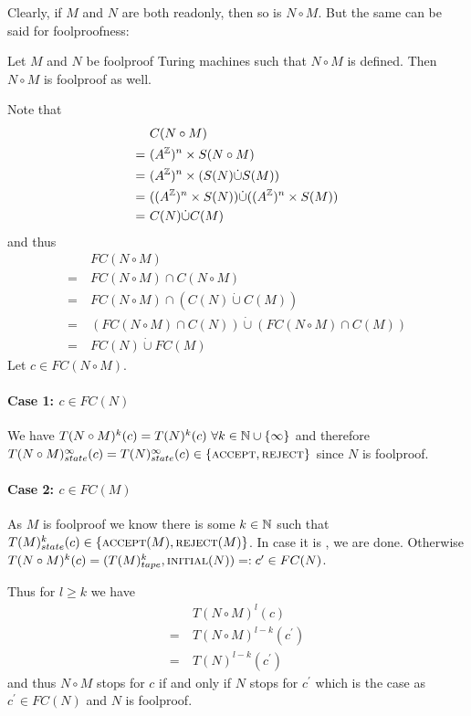 Clearly, if $M$ and $N$ are both readonly, then so is $N \circ M$. But the same can be said for foolproofness:

\begin{Lemma}
	Let $M$ and $N$ be foolproof Turing machines such that $N \circ M$ is defined. Then $N \circ M$ is foolproof as well.
\end{Lemma}
\proof
Note that
\begin{align*}
	&C(N \circ M) \\
	=~&(A^{\mathbb{Z}})^n \times S(N \circ M) \\
	=~&(A^{\mathbb{Z}})^n \times (S(N) \dot\cup S(M)) \\
	=~&((A^{\mathbb{Z}})^n \times S(N)) \dot\cup ((A^{\mathbb{Z}})^n \times S(M)) \\
	=~&C(N) \dot\cup C(M)
\end{align*}
and thus
\begin{align*}
	&FC(N \circ M) \\
	=~&FC(N \circ M) \cap C(N \circ M) \\
	=~&FC(N \circ M) \cap (C(N) \dot\cup C(M)) \\
	=~&(FC(N \circ M) \cap C(N)) \dot\cup (FC(N \circ M) \cap C(M)) \\
	=~&FC(N) \dot\cup FC(M)
\end{align*}
Let $c \in FC(N \circ M)$.
\paragraph{Case 1: $c \in FC(N)$}
We have
$T(N \circ M)^k (c) = T(N)^k (c) ~\forall k \in \mathbb{N} \cup \{\infty\}$
and therefore $T(N \circ M)_{state}^\infty(c) = T(N)_{state}^\infty(c) \in \{\text{\scshape{accept}},\text{\scshape{reject}}\}$
since $N$ is foolproof.
\paragraph{Case 2: $c \in FC(M)$}
As $M$ is foolproof we know there is some $k \in \mathbb{N}$ such that $T(M)_{state}^k(c) \in \{\text{\scshape{accept}}(M),\text{\scshape{reject}}(M)\}$.
In case it is \REJ, we are done.
Otherwise $T(N \circ M)^k(c) = (T(M)_{tape}^k,\text{\scshape{initial}}(N)) =: c^\prime \in FC(N)$.

Thus for $l \geq k$ we have
\begin{align*}
	&T(N \circ M)^l(c) \\
	=~&T(N \circ M)^{l-k}(c^\prime) \\
	=~&T(N)^{l-k}(c^\prime)
\end{align*}
and thus $N \circ M$ stops for $c$ if and only if $N$ stops for $c^\prime$ which is the case as $c^\prime \in FC(N)$ and $N$ is foolproof.
\endproof
